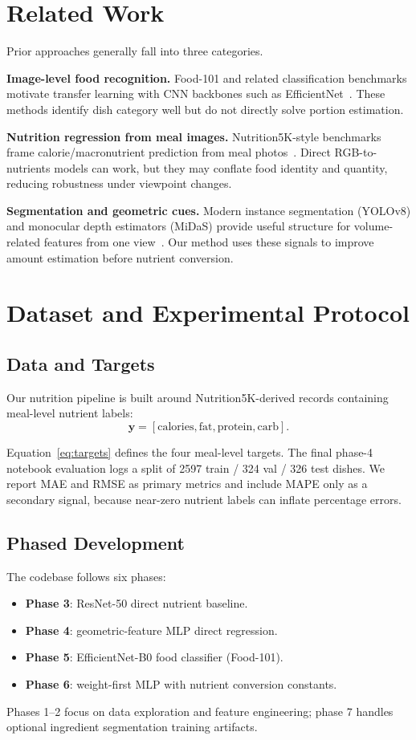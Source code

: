 \documentclass[10pt,twocolumn,letterpaper]{article}
\begin{document}
\section{Related Work}
Prior approaches generally fall into three categories.

\textbf{Image-level food recognition.}
Food-101 and related classification benchmarks motivate transfer learning with CNN backbones such as EfficientNet~\cite{bossard2014food101,tan2019efficientnet}. These methods identify dish category well but do not directly solve portion estimation.

\textbf{Nutrition regression from meal images.}
Nutrition5K-style benchmarks frame calorie/macronutrient prediction from meal photos~\cite{nutrition5kweb}. Direct RGB-to-nutrients models can work, but they may conflate food identity and quantity, reducing robustness under viewpoint changes.

\textbf{Segmentation and geometric cues.}
Modern instance segmentation (YOLOv8) and monocular depth estimators (MiDaS) provide useful structure for volume-related features from one view~\cite{ultralytics2023,midasrepo}. Our method uses these signals to improve amount estimation before nutrient conversion.

\section{Dataset and Experimental Protocol}
\subsection{Data and Targets}
Our nutrition pipeline is built around Nutrition5K-derived records containing meal-level nutrient labels:
\begin{equation}
\mathbf{y}=[\text{calories},\text{fat},\text{protein},\text{carb}].
\label{eq:targets}
\end{equation}

Equation~\eqref{eq:targets} defines the four meal-level targets. The final phase-4 notebook evaluation logs a split of 2597 train / 324 val / 326 test dishes. We report MAE and RMSE as primary metrics and include MAPE only as a secondary signal, because near-zero nutrient labels can inflate percentage errors.

\subsection{Phased Development}
The codebase follows six phases:
\begin{itemize}
\item \textbf{Phase 3}: ResNet-50 direct nutrient baseline.
\item \textbf{Phase 4}: geometric-feature MLP direct regression.
\item \textbf{Phase 5}: EfficientNet-B0 food classifier (Food-101).
\item \textbf{Phase 6}: weight-first MLP with nutrient conversion constants.
\end{itemize}
Phases 1--2 focus on data exploration and feature engineering; phase 7 handles optional ingredient segmentation training artifacts.
\end{document}
